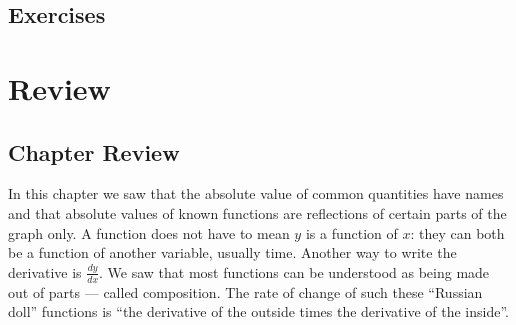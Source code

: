 \subsection{Exercises}
\noindent{}




\newpage
\section{Review}
\subsection{Chapter Review}
In this chapter we saw that the absolute value of common quantities have names and that absolute
values of known functions are reflections of certain parts of the graph only.  
A function does not have to mean $y$ is a function of $x$: they can both be a function of
another variable, usually time.  Another way to write the derivative is $\frac{dy}{dx}$.
We saw that most functions can be understood as being
made out of parts --- called composition.  The rate of change of such these ``Russian doll''
functions is ``the derivative of the outside times the derivative of the inside''.


